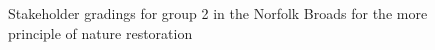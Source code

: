 \documentclass[
  12pt,
  letterpaper,
  DIV=11,
  numbers=noendperiod]{scrartcl}
\begin{document}
\begin{figure}[H]


\caption{\label{fig-BroadsMoreG2}Stakeholder gradings for group 2 in the
Norfolk Broads for the more principle of nature restoration}

\end{figure}%
\end{document}
